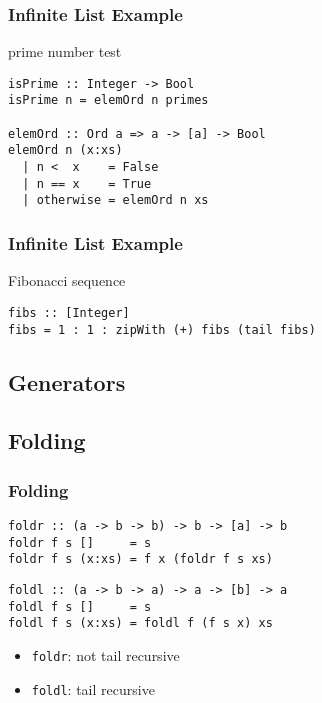 \documentclass[dvipsnames]{beamer}
\theoremstyle{plain}
\begin{document}
\begin{frame}[fragile]
  \frametitle{Infinite List Example}

  \begin{exampleblock}{prime number test}
    \begin{lstlisting}
isPrime :: Integer -> Bool
isPrime n = elemOrd n primes

elemOrd :: Ord a => a -> [a] -> Bool
elemOrd n (x:xs)
  | n <  x    = False
  | n == x    = True
  | otherwise = elemOrd n xs
    \end{lstlisting}
  \end{exampleblock}
\end{frame}

\begin{frame}[fragile]
  \frametitle{Infinite List Example}

  \begin{exampleblock}{Fibonacci sequence}
    \begin{lstlisting}
fibs :: [Integer]
fibs = 1 : 1 : zipWith (+) fibs (tail fibs)
    \end{lstlisting}
  \end{exampleblock}
\end{frame}

\subsection{Generators}

\subsection{Folding}

\begin{frame}[fragile]
  \frametitle{Folding}

  \begin{lstlisting}
foldr :: (a -> b -> b) -> b -> [a] -> b
foldr f s []     = s
foldr f s (x:xs) = f x (foldr f s xs)
    \end{lstlisting}

    \begin{lstlisting}
foldl :: (a -> b -> a) -> a -> [b] -> a
foldl f s []     = s
foldl f s (x:xs) = foldl f (f s x) xs
  \end{lstlisting}

  \medskip
  \begin{itemize}
    \item \lstinline|foldr|: not tail recursive
    \item \lstinline|foldl|: tail recursive
  \end{itemize}
\end{frame}
\end{document}
